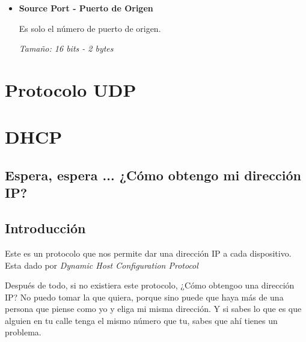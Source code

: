 \documentclass[12pt, fleqn]{report}                             %
\theoremstyle{break}                                            %
\begin{document}
                \begin{itemize}
                    \item \textbf{Source Port - Puerto de Origen}

                        Es solo el número de puerto de origen.

                        \emph{Tamaño: 16 bits - 2 bytes}


                \end{itemize}




    \clearpage
    \chapter{Protocolo UDP}





    \chapter{DHCP}
    \section*{Espera, espera ... ¿Cómo obtengo mi dirección IP?}


        \clearpage
        \section{Introducción}

            Este es un protocolo que nos permite dar una dirección IP a cada dispositivo.
            Esta dado por \emph{Dynamic Host Configuration Protocol}

            Después de todo, si no existiera este protocolo, ¿Cómo obtengoo una dirección IP?
            No puedo tomar la que quiera, porque sino puede que haya más de una persona que piense
            como yo y eliga mi misma dirección.
            Y si sabes lo que es que alguien en tu calle tenga el mismo número que tu, sabes que 
            ahí tienes un problema.
\end{document}
